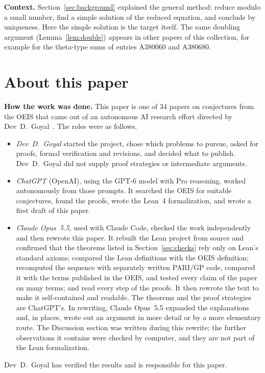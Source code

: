 \documentclass[11pt,a4paper]{article}
\theoremstyle{definition}
\theoremstyle{remark}
\newcommand{\para}[1]{\par\medskip\noindent\textbf{#1}\enspace}
\begin{document}
\para{Context.} Section~\ref{sec:background} explained the general method: reduce modulo a small number, find a simple
solution of the reduced equation, and conclude by uniqueness. Here the simple solution is the target itself. The same
doubling argument (Lemma~\ref{lem:double}) appears in other papers of this collection, for example for the theta-type
sums of entries A380060 and A380680.

\section*{About this paper}\label{sec:about}
\para{How the work was done.}
This paper is one of 34 papers on conjectures from the OEIS that came out of an autonomous AI research effort directed
by Dev~D.~Goyal~\cite{repo}. The roles were as follows.
\begin{itemize}
\item \emph{Dev~D.~Goyal} started the project, chose which problems to pursue, asked for proofs, formal verification and
revisions, and decided what to publish. Dev~D.~Goyal did not supply proof strategies or intermediate arguments.
\item \emph{ChatGPT} (OpenAI), using the GPT-6 model with Pro reasoning, worked autonomously from those prompts. It
searched the OEIS for suitable conjectures, found the proofs, wrote the Lean~4 formalization, and wrote a first draft
of this paper.
\item \emph{Claude Opus~5.5}, used with Claude Code, checked the work independently and then rewrote this paper. It
rebuilt the Lean project from source and confirmed that the theorems listed in Section~\ref{sec:checks} rely only on
Lean's standard axioms; compared the Lean definitions with the OEIS definition; recomputed the sequence with separately
written PARI/GP code, compared it with the terms published in the OEIS, and tested every claim of the paper on many
terms; and read every step of the proofs. It then rewrote the text to make it self-contained and readable. The
theorems and the proof strategies are ChatGPT's. In rewriting, Claude Opus~5.5 expanded the explanations and, in
places, wrote out an argument in more detail or by a more elementary route. The Discussion section was written during
this rewrite; the further observations it contains were checked by computer, and they are not part of the Lean
formalization.
\end{itemize}
Dev~D.~Goyal has verified the results and is responsible for this paper.
\end{document}
